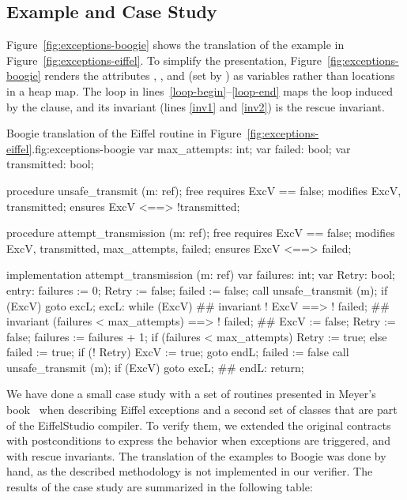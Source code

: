 \subsection{Example and Case Study} \label{sec:m-exceptions:example}


Figure~\ref{fig:exceptions-boogie} shows the translation of the example in Figure~\ref{fig:exceptions-eiffel}. 
To simplify the presentation, Figure~\ref{fig:exceptions-boogie} renders the attributes , , and  (set by ) as variables rather than locations in a heap map.
The loop in lines~\ref{loop-begin}--\ref{loop-end} maps the loop induced by the  clause, and its invariant (lines \ref{inv1} and \ref{inv2}) is the rescue invariant.

\begin{bfigure}[hp]{Boogie translation of the Eiffel routine in Figure~\ref{fig:exceptions-eiffel}.}{fig:exceptions-boogie}
var max_attempts: int; 
var failed: bool; 
var transmitted: bool;

procedure unsafe_transmit (m: ref);
	free requires ExcV == false;
	modifies ExcV, transmitted;
	ensures ExcV <==> !transmitted;

procedure attempt_transmission (m: ref);
	free requires ExcV == false;
	modifies ExcV, transmitted, max_attempts, failed;
	ensures ExcV <==> failed;

implementation attempt_transmission (m: ref)
{
		var failures: int;
		var Retry: bool;  
	entry:
		failures := 0; Retry := false; failed := false;
		call unsafe_transmit (m); if (ExcV) { goto excL; }       
	excL:
			while (ExcV) #\label{loop-begin}#
			invariant ! ExcV ==> ! failed; #\label{inv1}#
			invariant (failures < max_attempts) ==> ! failed; #\label{inv2}#
			{    
				ExcV := false; Retry := false;
				failures := failures + 1; 
				if (failures < max_attempts) {
					Retry := true;
				} else {
					failed := true;
				}
				if (! Retry) {ExcV := true; goto endL;}    
				failed := false
				call unsafe_transmit (m); if (ExcV) { goto excL; }
			}  #\label{loop-end}#
	endL:
		return;
}     
\end{bfigure}

We have done a small case study with a set of routines presented in Meyer's book~\cite{MEYER97} when describing Eiffel exceptions and a second set of classes that are part of the EiffelStudio compiler. To verify them, we extended the original contracts with postconditions to express the behavior when exceptions are triggered, and with rescue invariants. The translation of the examples to Boogie was done by hand, as the described methodology is not implemented in our verifier. The results of the case study are summarized in the following table:

